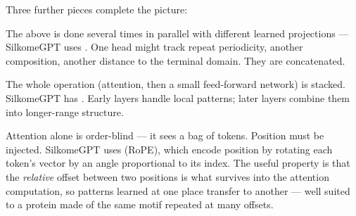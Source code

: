 Three further pieces complete the picture:

\begin{description}[leftmargin=0cm,style=nextline,itemsep=4pt]
\item[Multi-head attention.] The above is done several times in parallel with
  different learned projections --- SilkomeGPT uses . One head
  might track repeat periodicity, another composition, another distance to the
  terminal domain. They are concatenated.

\item[Layers.] The whole operation (attention, then a small feed-forward
  network) is stacked. SilkomeGPT has . Early layers
  handle local patterns; later layers combine them into longer-range structure.

\item[Positional information.] Attention alone is order-blind --- it sees a bag
  of tokens. Position must be injected. SilkomeGPT uses  (RoPE), which encode position by rotating each token's vector by
  an angle proportional to its index. The useful property is that the
  \emph{relative} offset between two positions is what survives into the
  attention computation, so patterns learned at one place transfer to another
  --- well suited to a protein made of the same motif repeated at many offsets.
\end{description}

